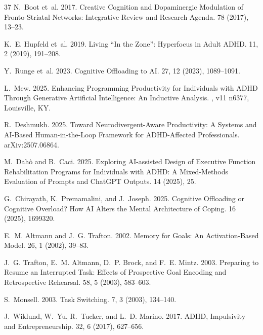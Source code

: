 \documentclass[sigconf,nonacm]{acmart}
\begin{document}
\begin{thebibliography}{37}
N.~Boot et~al. 2017.
\newblock Creative Cognition and Dopaminergic Modulation of Fronto-Striatal Networks: Integrative Review and Research Agenda.
 78 (2017), 13--23.

K.~E. Hupfeld et~al. 2019.
\newblock Living ``In the Zone'': Hyperfocus in Adult ADHD.
 11, 2 (2019), 191--208.

Y.~Runge et~al. 2023.
\newblock Cognitive Offloading to AI.
 27, 12 (2023), 1089--1091.

L.~Mew. 2025.
\newblock Enhancing Programming Productivity for Individuals with ADHD Through Generative Artificial Intelligence: An Inductive Analysis.
, v11 n6377, Louisville, KY.

R.~Deshmukh. 2025.
\newblock Toward Neurodivergent-Aware Productivity: A Systems and AI-Based Human-in-the-Loop Framework for ADHD-Affected Professionals.
 arXiv:2507.06864.

M.~Dah\`{o} and B.~Caci. 2025.
\newblock Exploring AI-assisted Design of Executive Function Rehabilitation Programs for Individuals with ADHD: A Mixed-Methods Evaluation of Prompts and ChatGPT Outputs.
 14 (2025), 25.

G.~Chirayath, K.~Premamalini, and J.~Joseph. 2025.
\newblock Cognitive Offloading or Cognitive Overload? How AI Alters the Mental Architecture of Coping.
 16 (2025), 1699320.

E.~M. Altmann and J.~G. Trafton. 2002.
\newblock Memory for Goals: An Activation-Based Model.
 26, 1 (2002), 39--83.

J.~G. Trafton, E.~M. Altmann, D.~P. Brock, and F.~E. Mintz. 2003.
\newblock Preparing to Resume an Interrupted Task: Effects of Prospective Goal Encoding and Retrospective Rehearsal.
 58, 5 (2003), 583--603.

S.~Monsell. 2003.
\newblock Task Switching.
 7, 3 (2003), 134--140.

J.~Wiklund, W.~Yu, R.~Tucker, and L.~D. Marino. 2017.
\newblock ADHD, Impulsivity and Entrepreneurship.
 32, 6 (2017), 627--656.


\end{thebibliography}
\end{document}
